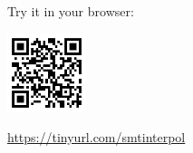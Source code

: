 \documentclass[table,aspectratio=169]{beamer}
\begin{document}
\begin{frame}
\begin{columns}[t]
\begin{column}{.5\textwidth}
    Try it in your browser:\\[2pt]
    \centerline{\href{https://ultimate.infomatik.uni-freiburg.de/smtinterpol/online}{\includegraphics[width=2.3cm]{smtinterpol-url}}}
    \centerline{\url{https://tinyurl.com/smtinterpol}}
  \end{column}
  \end{columns}
\end{frame}
\end{document}
